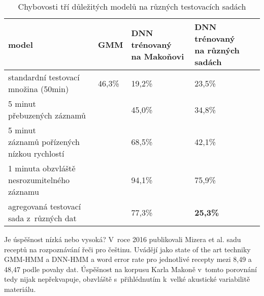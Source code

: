 \begin{table}[htpb]
\begin{center}
\begin{tabular}{|l|l|l|l|}
\hline
model & GMM & \makecell{ DNN trénovaný\\ na Makoňovi } & \makecell{ DNN trénovaný\\ na různých sadách } \\
\hline
\makecell{standardní testovací\\ množina (50min)} & 46,3\% & 19,2\% & 23,5\% \\ \hline
\makecell{5 minut\\ přebuzených záznamů} & & 45,0\% & 34,8\% \\ \hline
\makecell{ 5 minut\\ záznamů pořízených\\ nízkou rychlostí } & & 68,5\% & 42,1\% \\ \hline
\makecell{ 1 minuta obzvláště\\ nesrozumitelného záznamu } & & 94,1\% & 75,9\% \\ \hline
\makecell{agregovaná testovací\\ sada z~různých dat} & & 77,3\% & \textbf{25,3\%} \\ \hline
\end{tabular}
\caption{Chybovosti tří důležitých modelů na různých testovacích sadách}\label{tab:asr-scores}
\end{center}
\end{table}

Je úspěšnost nízká nebo vysoká? V~roce 2016 publikovali Mizera et
al.\cite{mizera2016kaldi} sadu receptů na rozpoznávání řeči pro češtinu.
Uvádějí jako state of the art techniky GMM-HMM a DNN-HMM a word error rate pro
jednotlivé recepty mezi 8,49 a 48,47 podle povahy dat. Úspěšnost na korpusu
Karla Makoně v~tomto porovnání tedy nijak nepřekvapuje, obzvláště s~přihlédnutím
k~velké akustické variabilitě materiálu.
